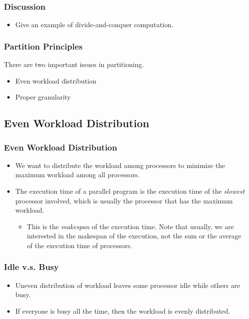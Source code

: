 \documentclass{beamer}
\begin{document}
\begin{CJK}{UTF8}{bsmi}
\begin{frame}
\frametitle{Discussion}
\begin{itemize}
\item Give an example of divide-and-conquer computation.
\end{itemize}
\end{frame}

\begin{frame}
\frametitle{Partition Principles}
There are two important issues in partitioning.
\begin{itemize}
\item Even workload distribution
\item Proper granularity
\end{itemize}
\end{frame}

\subsection{Even Workload Distribution}

\begin{frame}
\frametitle{Even Workload Distribution}
\begin{itemize}
\item We want to distribute the workload among processors to minimize the maximum workload among all processors.
\item The execution time of a parallel program is the execution time of the {\em slowest} processor involved, which is usually the processor that has the maximum workload.
\begin{itemize}
\item This is the {\em makespan} of the execution time.  
Note that usually, we are interested in the makespan of the execution, not the sum or the average of the execution time of processors.
\end{itemize}
\end{itemize}
\end{frame}

\begin{frame}
\frametitle{Idle v.s. Busy}
\begin{itemize}
\item Uneven distribution of workload leaves some processor idle while others are busy.
\item If everyone is busy all the time, then the workload is evenly distributed.
\end{itemize}
\end{frame}


\end{CJK}
\end{document}
